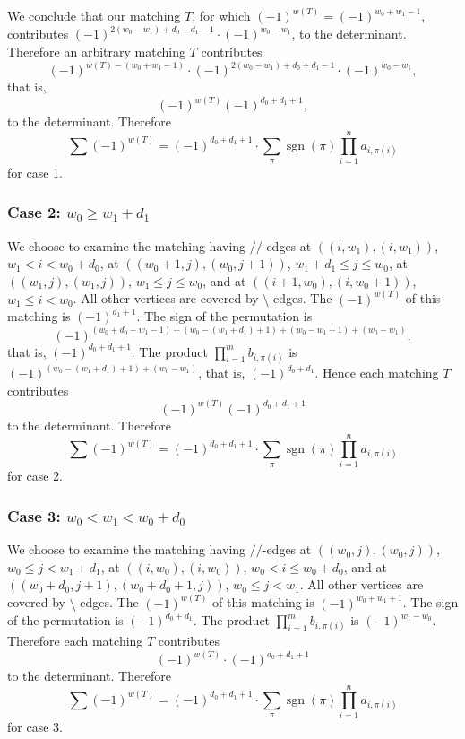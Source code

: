 \documentclass[10pt,reqno]{amsart}
\theoremstyle{plain}
\theoremstyle{definition}
\theoremstyle{remark}
\DeclareMathOperator{\sgn }{sgn }
\begin{document}
We conclude that our matching $T$, for which 
$(-1)^{w(T)} = (-1)^{w_0+w_1-1}$, contributes 
$(-1)^{2(w_0-w_1)+d_0+d_1-1}\cdot (-1)^{w_0-w_1}$, to the determinant.
Therefore an arbitrary matching $T$ contributes
\begin{equation}
(-1)^{w(T)-(w_0+w_1-1)}\cdot 
(-1)^{2(w_0-w_1)+d_0+d_1-1}\cdot (-1)^{w_0-w_1},
\end{equation}
that is,
\begin{equation}
(-1)^{w(T)} (-1)^{d_0+d_1+1},
\end{equation}
 to the determinant. Therefore
\[
\sum (-1)^{w(T)} = (-1)^{d_0+d_1+1}\cdot 
\sum_{\pi } \sgn(\pi ) \prod_{i=1}^n a_{i,\pi(i)} \] for case 1.

\subsubsection{Case 2: $w_0\geq w_1+d_1$}

We choose to examine the matching having $//$-edges at 
$((i,w_1),(i,w_1))$, $w_1<i<w_0+d_0$, at
$((w_0+1,j),(w_0,j+1))$, $w_1+d_1\leq j\leq w_0$, at
$((w_1,j),(w_1,j))$, $w_1\leq j\leq w_0$, and at
$((i+1,w_0),(i,w_0+1))$, $w_1\leq i<w_0$. All other vertices are covered
by $\setminus$-edges. The $(-1)^{w(T)}$ of this matching is 
$(-1)^{d_1+1}$.
The sign of the permutation is 
\begin{equation}
(-1)^{(w_0+d_0-w_1-1)+(w_0-(w_1+d_1)+1)+(w_0-w_1+1)+(w_0-w_1)},
\end{equation}
that is, $(-1)^{d_0+d_1+1}$. The product $\prod_{i=1}^m b_{i,\pi(i)}$
is $(-1)^{(w_0-(w_1+d_1)+1) + (w_0-w_1)}$, that is, $(-1)^{d_0+d_1}$.
Hence each matching $T$ 
contributes 
\begin{equation}
(-1)^{w(T)} (-1)^{d_0+d_1+1}
\end{equation} to the determinant.
Therefore
\[
\sum (-1)^{w(T)} = (-1)^{d_0+d_1+1}\cdot 
\sum_{\pi } \sgn(\pi ) \prod_{i=1}^n a_{i,\pi(i)} \] for case 2.
\subsubsection{Case 3: $w_0<w_1<w_0+d_0$}

We choose to examine the matching having $//$-edges at
$((w_0,j),(w_0,j))$, $w_0\leq j<w_1+d_1$, at
$((i,w_0),(i,w_0))$, $w_0<i\leq w_0+d_0$, and at
$((w_0+d_0,j+1),(w_0+d_0+1,j))$, $w_0\leq j<w_1$. All other vertices are 
covered by $\setminus$-edges. The $(-1)^{w(T)}$ of this matching is
$(-1)^{w_0+w_1+1}$. The sign of the permutation is
$(-1)^{d_0+d_1}$. The product $\prod_{i=1}^m b_{i,\pi(i)}$
is $(-1)^{w_1-w_0}$. Therefore each matching $T$ 
contributes 
\begin{equation}
(-1)^{w(T)}\cdot (-1)^{d_0+d_1+1}
\end{equation}
to the determinant.
Therefore
\[
\sum (-1)^{w(T)} = (-1)^{d_0+d_1+1}\cdot 
\sum_{\pi } \sgn(\pi ) \prod_{i=1}^n a_{i,\pi(i)} \] for case 3.
\end{document}
